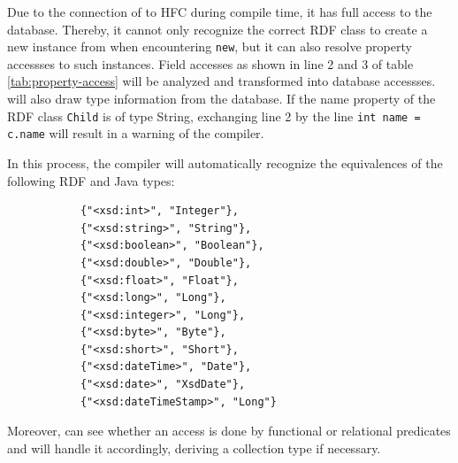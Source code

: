 %
Due to the connection of \vonda to HFC during compile time, it has full access to the database. Thereby, it cannot only recognize the correct RDF class to create a new instance from when encountering \texttt{new}, but it can also resolve property accessses to such instances. Field accesses as shown in line 2 and 3 of table \ref{tab:property-access} will be analyzed and transformed into database accessses. \vonda will also draw type information from the database. If the name property of the RDF class \texttt{Child} is of type String, exchanging line 2 by the line \texttt{int name = c.name} will result in a warning of the compiler.

In this process, the compiler will automatically recognize the equivalences of the following RDF and Java types:

\begin{figure}[h]
\small
\begin{lstlisting}
      {"<xsd:int>", "Integer"},
      {"<xsd:string>", "String"},
      {"<xsd:boolean>", "Boolean"},
      {"<xsd:double>", "Double"},
      {"<xsd:float>", "Float"},
      {"<xsd:long>", "Long"},
      {"<xsd:integer>", "Long"},
      {"<xsd:byte>", "Byte"},
      {"<xsd:short>", "Short"},
      {"<xsd:dateTime>", "Date"},
      {"<xsd:date>", "XsdDate"},
      {"<xsd:dateTimeStamp>", "Long"}
\end{lstlisting}
\end{figure}

%
Moreover, \vonda can see whether an access is done by functional or relational predicates and will handle it accordingly, deriving a collection type if necessary.

